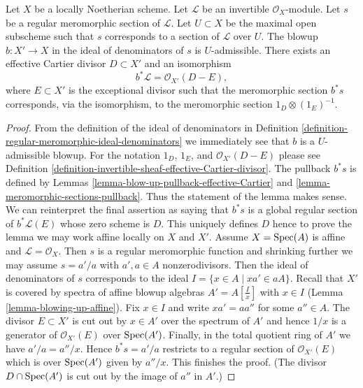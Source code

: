 \begin{lemma}
\label{lemma-blowing-up-denominators}
Let $X$ be a locally Noetherian scheme.
Let $\mathcal{L}$ be an invertible $\mathcal{O}_X$-module.
Let $s$ be a regular meromorphic section of $\mathcal{L}$.
Let $U \subset X$ be the maximal open subscheme such that
$s$ corresponds to a section of $\mathcal{L}$ over $U$.
The blowup $b : X' \to X$ in the ideal of denominators
of $s$ is $U$-admissible. There exists an effective Cartier divisor
$D \subset X'$ and an isomorphism
$$
b^*\mathcal{L} = \mathcal{O}_{X'}(D - E),
$$
where $E \subset X'$ is the exceptional divisor such that the
meromorphic section $b^*s$ corresponds, via the isomorphism,
to the meromorphic section $1_D \otimes (1_E)^{-1}$.
\end{lemma}

\begin{proof}
From the definition of the ideal of denominators in
Definition
\ref{definition-regular-meromorphic-ideal-denominators}
we immediately see that $b$ is a $U$-admissible blowup.
For the notation $1_D$, $1_E$, and $\mathcal{O}_{X'}(D - E)$
please see Definition
\ref{definition-invertible-sheaf-effective-Cartier-divisor}.
The pullback $b^*s$ is defined by
Lemmas \ref{lemma-blow-up-pullback-effective-Cartier} and
\ref{lemma-meromorphic-sections-pullback}.
Thus the statement of the lemma makes sense.
We can reinterpret the final assertion as saying
that $b^*s$ is a global regular section of
$b^*\mathcal{L}(E)$ whose zero scheme is $D$.
This uniquely defines $D$ hence
to prove the lemma we may work affine locally on $X$ and $X'$.
Assume $X = \mathop{\mathrm{Spec}}(A)$ is affine and
$\mathcal{L} = \mathcal{O}_X$. Then $s$ is a regular meromorphic
function and shrinking further we may assume
$s = a'/a$ with $a', a \in A$ nonzerodivisors.
Then the ideal of denominators of $s$ corresponds
to the ideal $I = \{x \in A \mid xa' \in aA\}$.
Recall that $X'$ is covered by spectra of affine blowup
algebras $A' = A[\frac{I}{x}]$ with $x \in I$
(Lemma \ref{lemma-blowing-up-affine}). Fix $x \in I$ and
write $xa' = a a''$ for some $a'' \in A$.
The divisor $E \subset X'$ is cut out by $x \in A'$ over
the spectrum of $A'$ and hence $1/x$ is a 
generator of $\mathcal{O}_{X'}(E)$ over $\mathop{\mathrm{Spec}}(A')$.
Finally, in the total quotient ring
of $A'$ we have $a'/a = a''/x$. Hence $b^*s = a'/a$ restricts
to a regular section of $\mathcal{O}_{X'}(E)$ which is
over $\mathop{\mathrm{Spec}}(A')$ given by $a''/x$. This finishes the proof.
(The divisor $D \cap \mathop{\mathrm{Spec}}(A')$ is cut out by the image of
$a''$ in $A'$.)
\end{proof}






